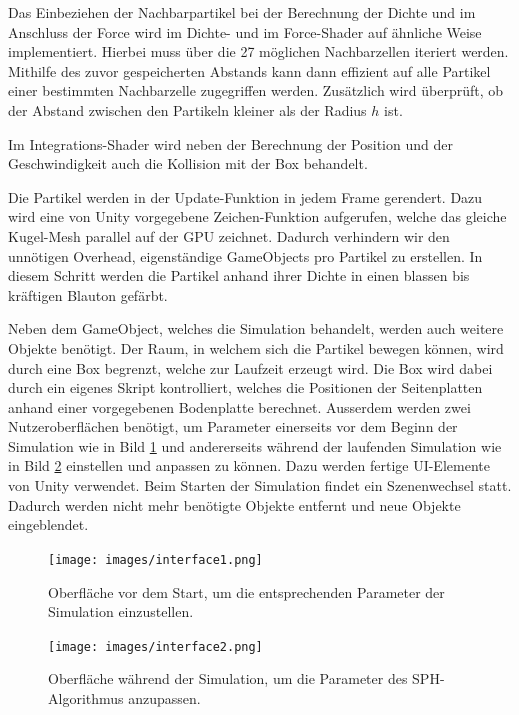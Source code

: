 \documentclass[a4paper]{paper}
\begin{document}
Das Einbeziehen der Nachbarpartikel bei der Berechnung der Dichte und im Anschluss der Force wird im Dichte- und im Force-Shader auf ähnliche Weise implementiert. Hierbei muss über die 27 möglichen Nachbarzellen iteriert werden. Mithilfe des zuvor gespeicherten Abstands kann dann effizient auf alle Partikel einer bestimmten Nachbarzelle zugegriffen werden. Zusätzlich wird überprüft, ob der Abstand zwischen den Partikeln kleiner als der Radius $h$ ist.

Im Integrations-Shader wird neben der Berechnung der Position und der Geschwindigkeit auch die Kollision mit der Box behandelt.

Die Partikel werden in der Update-Funktion in jedem Frame gerendert. Dazu wird eine von Unity vorgegebene Zeichen-Funktion aufgerufen, welche das gleiche Kugel-Mesh parallel auf der GPU zeichnet. Dadurch verhindern wir den unnötigen Overhead, eigenständige GameObjects pro Partikel zu erstellen. In diesem Schritt werden die Partikel anhand ihrer Dichte in einen blassen bis kräftigen Blauton gefärbt.

Neben dem GameObject, welches die Simulation behandelt, werden auch weitere Objekte benötigt. Der Raum, in welchem sich die Partikel bewegen können, wird durch eine Box begrenzt, welche zur Laufzeit erzeugt wird. Die Box wird dabei durch ein eigenes Skript kontrolliert, welches die Positionen der Seitenplatten anhand einer vorgegebenen Bodenplatte berechnet.
Ausserdem werden zwei Nutzeroberflächen benötigt, um Parameter einerseits vor dem Beginn der Simulation wie in Bild \ref{fig:interface1} und andererseits während der laufenden Simulation wie in Bild \ref{fig:interface2} einstellen und anpassen zu können. Dazu werden fertige UI-Elemente von Unity verwendet. Beim Starten der Simulation findet ein Szenenwechsel statt. Dadurch werden nicht mehr benötigte Objekte entfernt und neue Objekte eingeblendet.

\begin{figure}[t]
    \centering
    \texttt{[image: images/interface1.png]}
    \caption{Oberfläche vor dem Start, um die entsprechenden Parameter der Simulation einzustellen.}
    \label{fig:interface1}
\end{figure}

\begin{figure}[t]
    \centering
    \texttt{[image: images/interface2.png]}
    \caption{Oberfläche während der Simulation, um die Parameter des SPH-Algorithmus anzupassen.}
    \label{fig:interface2}
\end{figure}
\end{document}
